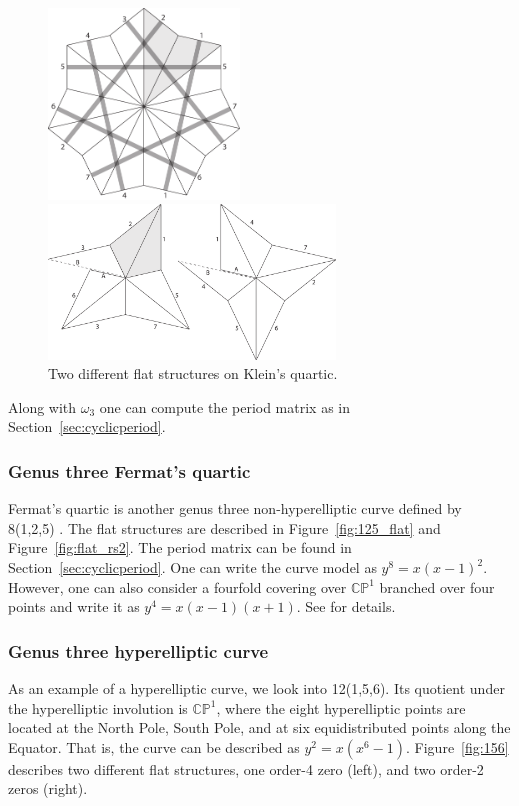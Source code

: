 \documentclass[12pt,reqno]{amsart}
\newcommand{\C}{\mathbb{C}}
\renewcommand{\P}{\mathbb{P}}
\theoremstyle{definition}
\theoremstyle{remark}
\begin{document}
\begin{figure}[htbp] 
\centering
\begin{minipage}{0.5\textwidth}
  \centering
  \includegraphics[width=2in]{figures/124_flat.pdf}
\end{minipage}%
\begin{minipage}{0.5\textwidth}
  \centering
  \includegraphics[width=3in]{figures/124_flat_2.pdf}
\end{minipage}
  \caption{Two different flat structures on Klein's quartic.}
  \label{fig:124}
\end{figure}

Along with $\omega_3$ one can compute the period matrix as in Section~\ref{sec:cyclicperiod}.

\subsubsection{Genus three Fermat's quartic}
Fermat's quartic is another genus three non-hyperelliptic curve defined by 8(1,2,5) \cite{dami}. The flat structures are described in Figure~\ref{fig:125_flat} and Figure~\ref{fig:flat_rs2}. The period matrix can be found in Section~\ref{sec:cyclicperiod}. One can write the curve model as $y^8 = x (x-1)^2.$ However, one can also consider a fourfold covering over $\C\P^1$ branched over four points and write it as $y^4 = x (x-1) (x+1).$ See \cite{dami} for details.

\subsubsection{Genus three hyperelliptic curve}
As an example of a hyperelliptic curve, we look into 12(1,5,6). Its quotient under the hyperelliptic involution is $\C\P^1$, where the eight hyperelliptic points are located at the North Pole, South Pole, and at six equidistributed points along the Equator. That is, the curve can be described as $y^2 = x(x^6 -1).$ Figure~\ref{fig:156} describes two different flat structures, one order-4 zero (left), and two order-2 zeros (right).
\end{document}
